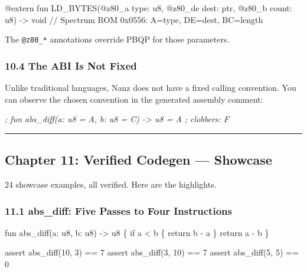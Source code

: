 \documentclass[
  11pt,
]{article}
\newenvironment{Shaded}{}{}
\newcommand{\CommentTok}[1]{\textcolor[rgb]{0.38,0.63,0.69}{\textit{#1}}}
\newcommand{\NormalTok}[1]{#1}
\begin{document}
\begin{Shaded}
\begin{Highlighting}[]
\NormalTok{@extern fun LD\_BYTES(@z80\_a type: u8, @z80\_de dest: ptr, @z80\_b count: u8) {-}\textgreater{} void}
\NormalTok{// Spectrum ROM 0x0556: A=type, DE=dest, BC=length}
\end{Highlighting}
\end{Shaded}

The \texttt{@z80\_*} annotations override PBQP for those parameters.

\subsubsection{10.4 The ABI Is Not Fixed}\label{the-abi-is-not-fixed}

Unlike traditional languages, Nanz does not have a fixed calling
convention. You can observe the chosen convention in the generated
assembly comment:

\begin{Shaded}
\begin{Highlighting}[]
\CommentTok{; fun abs\_diff(a: u8 = A, b: u8 = C) {-}\textgreater{} u8 = A ; clobbers: F}
\end{Highlighting}
\end{Shaded}

\begin{center}\rule{0.5\linewidth}{0.5pt}\end{center}

\subsection{Chapter 11: Verified Codegen ---
Showcase}\label{chapter-11-verified-codegen-showcase}

24 showcase examples, all verified. Here are the highlights.

\subsubsection{11.1 abs\_diff: Five Passes to Four
Instructions}\label{abs_diff-five-passes-to-four-instructions}

\begin{Shaded}
\begin{Highlighting}[]
\NormalTok{fun abs\_diff(a: u8, b: u8) {-}\textgreater{} u8 \{}
\NormalTok{    if a \textless{} b \{ return b {-} a \}}
\NormalTok{    return a {-} b}
\NormalTok{\}}

\NormalTok{assert abs\_diff(10, 3) == 7}
\NormalTok{assert abs\_diff(3, 10) == 7}
\NormalTok{assert abs\_diff(5, 5)  == 0}
\end{Highlighting}
\end{Shaded}
\end{document}
